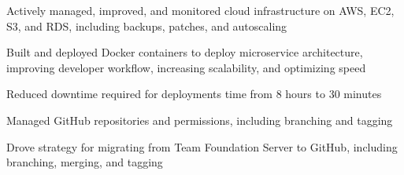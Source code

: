 \begin{cventries}
{\begin{cvitems}
        \item {Actively managed, improved, and monitored cloud infrastructure on AWS, EC2, S3, and RDS, including backups, patches, and autoscaling}
        \item {Built and deployed Docker containers to deploy microservice architecture, improving developer workflow, increasing scalability, and optimizing speed}
        \item {Reduced downtime required for deployments time from 8 hours to 30 minutes}
        \item {Managed GitHub repositories and permissions, including branching and tagging}
        \item {Drove strategy for migrating from Team Foundation Server to GitHub, including branching, merging, and tagging}
      \end{cvitems}
    }


\end{cventries}
